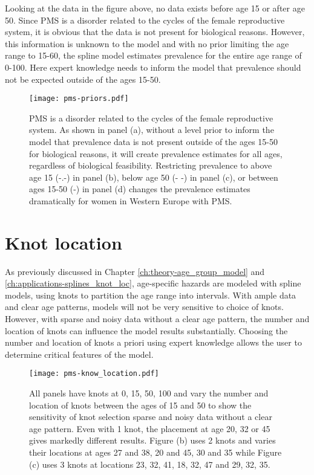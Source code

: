 Looking at the data in the figure above, no data exists before age 15 or after age 50.  Since PMS is a disorder related to the cycles of the female reproductive system, it is obvious that the data is not present for biological reasons.  However, this information is unknown to the model and with no prior limiting the age range to 15-60, the spline model estimates prevalence for the entire age range of 0-100.  Here expert knowledge needs to inform the model that prevalence should not be expected outside of the ages 15-50.

    \begin{figure}
        \begin{center}
            \texttt{[image: pms-priors.pdf]}
        \end{center}
        \caption{PMS is a disorder related to the cycles of the female reproductive system.  As shown in panel (a), without a level prior to inform the model that prevalence data is not present outside of the ages 15-50 for biological reasons, it will create prevalence estimates for all ages, regardless of biological feasibility.  Restricting prevalence to above age 15 (-.-) in panel (b), below age 50 (- -) in panel (c), or between ages 15-50 (-) in panel (d) changes the prevalence estimates dramatically for women in Western Europe with PMS.}
        \label{fig:app-prios_on_level}
    \end{figure}

\section{Knot location}
As previously discussed in Chapter \ref{ch:theory-age_group_model} and \ref{ch:applications-splines_knot_loc}, age-specific hazards are modeled with spline models, using knots to partition the age range into intervals.  With ample data and clear age patterns, models will not be very sensitive to choice of knots.  However, with sparse and noisy data without a clear age pattern, the number and location of knots can influence the model results substantially.  Choosing the number and location of knots a priori using expert knowledge allows the user to determine critical features of the model.

    \begin{figure}
        \begin{center}
            \texttt{[image: pms-know\_location.pdf]}
        \end{center}
        \caption{All panels have knots at 0, 15, 50, 100 and vary the number and location of knots between the ages of 15 and 50 to show the sensitivity of knot selection sparse and noisy data without a clear age pattern. Even with 1 knot, the placement at age 20, 32 or 45 gives markedly different results.  Figure (b) uses 2 knots and varies their locations at ages 27 and 38, 20 and 45, 30 and 35 while Figure (c) uses 3 knots at locations {23, 32, 41}, {18, 32, 47} and {29, 32, 35}.}
        \label{fig:app-knot_loc}
    \end{figure}

